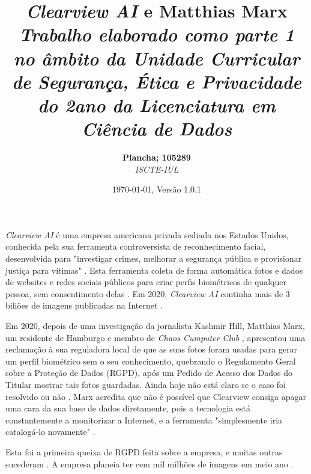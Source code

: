 \documentclass[portuguese, 12pt]{../diazessay}
\title{\textbf{\textit{\textit{Clearview AI}} e Matthias Marx} \\ {\Large\itshape Trabalho elaborado como parte 1 no âmbito da Unidade Curricular de Segurança, Ética e Privacidade do 2\textdegree ano da Licenciatura em Ciência de Dados}}
\author{\textbf{Plancha; 105289} \\ \textit{ISCTE-IUL}}
\date{\today , Versão 1.0.1}
\begin{document}
\maketitle
\textit{Clearview AI} é uma empresa americana privada sediada nos Estados Unidos, conhecida pela sua ferramenta controversista \parencite{nytClearview, CVBan} de reconhecimento facial, desenvolvida para "investigar crimes, melhorar a segurança pública e provisionar justiça para vítimas" \parencite{overview}. Esta ferramenta coleta de forma automática fotos e dados de websites e redes sociais públicos para criar perfis biométricos de qualquer pessoa, sem consentimento delas \parencite{EUpresp}. Em 2020, \textit{Clearview AI} continha mais de 3 biliões de imagens publicadas na Internet \parencite{EUpresp}.

Em 2020, depois de uma investigação da jornalista Kashmir Hill, Matthias Marx, um residente de Hamburgo e membro de \textit{Chaos Cumputer Club} \parencite{LegalComp}, apresentou uma reclamação à sua reguladora local de que as suas fotos foram usadas para gerar um perfil biométrico sem o seu conhecimento, quebrando o Regulamento Geral sobre a Proteção de Dados (RGPD), após um Pedido de Acesso dos Dados do Titular mostrar tais fotos guardadas. Ainda hoje não está claro se o caso foi resolvido ou não \parencite{wired}. Marx acredita que não é possível que Clearview consiga apagar uma cara da sua base de dados diretamente, pois a tecnologia está constantemente a monitorizar a Internet, e a ferramenta "simplesmente iria catalogá-lo novamente" \parencite{wired}.

Esta foi a primeira queixa de RGPD feita sobre a empresa, e muitas outras sucederam \parencite{LegalComp}. A empresa planeia ter cem mil milhões de imagens em meio ano \parencite{expansion}.


\printbibliography[title=Referências]
\end{document}

